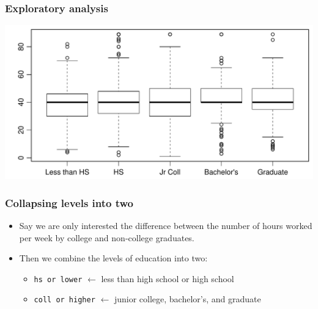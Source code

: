 \begin{frame}
\frametitle{Exploratory analysis}


\begin{center}
\includegraphics[width=\textwidth]{5-2_diff_two_mean/figures/hrs_edu/hrs_degree_box}
\end{center}

\end{frame}


\begin{frame}[fragile]
\frametitle{Collapsing levels into two}

\begin{itemize}

\item Say we are only interested the difference between the number of hours worked per week by college and non-college graduates.

\pause

\item Then we combine the levels of education into two:
\begin{itemize}
\item \texttt{hs or lower} $\leftarrow$ less than high school or high school
\item \texttt{coll or higher} $\leftarrow$ junior college, bachelor's, and graduate
\end{itemize}

\end{itemize}

\end{frame}


